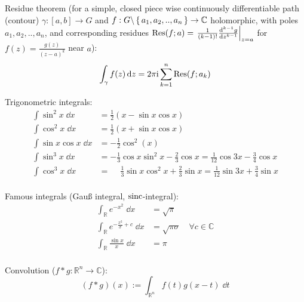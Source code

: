			\noindent
			Residue theorem (for a simple, closed piece wise continuously differentiable path (contour) $\gamma:\left[a,b\right]\rightarrow G$ and $f:G\backslash\set{a_1, a_2, .., a_n} \rightarrow \mathbb{C}$ holomorphic,
			with poles $a_1, a_2, .., a_n$, and corresponding residues $\mathrm{Res}(f; a) = \eval{\frac{1}{(k-1)!}\dv[k-1]{g}{z}}_{z=a}$ for $f(z)=\frac{g(z)}{(z-a)^k}$ near $a$):
			\begin{equation}
				\int_\gamma f(z)\,\dd z = 2\pi \mathrm{i} \sum_{k=1}^{n} \mathrm{Res}(f; a_k)
			\end{equation}

			\noindent
			Trigonometric integrals:
			\begin{equation}
				\begin{split}
					\int \sin^2 x\;\dd x &= \frac{1}{2}( x-\sin  x\cos  x) \\
					\int \cos^2 x\;\dd x &= \frac{1}{2}( x+\sin  x\cos  x) \\
					\int{\sin x\cos x\;\dd x} &= -\frac{1}{2}\cos^2( x) \\
					\int \sin^3 x\;\dd x &= -\frac{1}{3}\cos{ x}\sin^2{ x}-\frac{2}{3}\cos{ x}
					= \frac{1}{12}\cos{3 x}-\frac{3}{4}\cos{ x} \\
					\int \cos^3 x\;\dd x &= \phantom{-}\frac{1}{3}\sin x \cos^2 x+\frac{2}{3}\sin  x
					= \frac{1}{12}\sin{3 x}+\frac{3}{4}\sin{ x} \\
				\end{split}
			\end{equation}

			\noindent
			Famous integrals (Gauß integral, $\mathrm{sinc}$-integral):
			\begin{equation}
				\begin{aligned}
					\int_\mathbb{R} e^{-x^2}\;\dd x &= \sqrt{\pi} \\
					\int_\mathbb{R} e^{-\frac{x^2}{\sigma}+c}\;\dd x &= \sqrt{\pi\sigma} \quad\forall c\in\mathbb{C} \\
					\int_\mathbb{R} \frac{\sin x}{x}\;\dd x &= \pi \\
				\end{aligned}
			\end{equation}

			\noindent
			Convolution ($f*g:\mathbb{R}^n \rightarrow \mathbb{C}$):
			\begin{equation}
				(f*g)(x) := \int_{\mathbb{R}^n} f(t) g(x-t)\;\dd t
			\end{equation}

